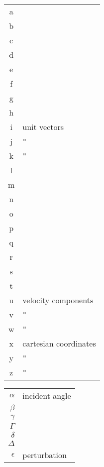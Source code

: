
\begin{multicols}{2}
\begin{tabular}{|c|l|} %
    \hline
        a & \\ 
        b & \\ 
        c& \\
        d& \\
        e& \\
        f& \\
        g& \\
        h& \\
        i& unit vectors\\
        j& \texttt{"} \\
        k& \texttt{"} \\
        l& \\
        m& \\
        n& \\
        o& \\
        p& \\
        q& \\
        r& \\
        s& \\
        t& \\
        u& velocity components \\ 
        v& \texttt{"} \\ 
        w& \texttt{"} \\
        x & cartesian coordinates\\
        y & \texttt{"} \\
        z & \texttt{"} \\
    \hline
\end{tabular}
\begin{tabular}{|r|l|} %
    \hline
        $\alpha$ & incident angle \\
        $\beta$ &  \\
        $\gamma$ & \\
        $\Gamma$ & \\
        $\delta$& \\
        $\Delta$ & \\
        $\epsilon$ & perturbation \\

\end{tabular}
\end{multicols}
